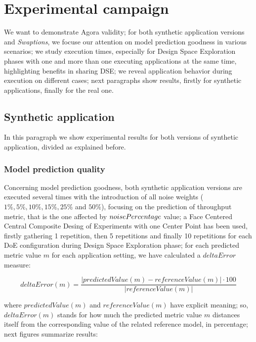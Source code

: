 \section{Experimental campaign}\label{campaign}

We want to demonstrate Agora validity; for both synthetic application versions and \textit{Swaptions}, we focuse our attention on model prediction goodness in various scenarios; we study execution times, especially for Design Space Exploration phases with one and more than one executing applications at the same time, highlighting benefits in sharing DSE; we reveal application behavior during execution on different cases; next paragraphs show results, firstly for synthetic applications, finally for the real one.


\subsection{Synthetic application}

In this paragraph we show experimental results for both versions of synthetic application, divided as explained before.


\subsubsection{Model prediction quality}\label{deltaErrorExplanation}

Concerning model prediction goodness, both synthetic application versions are executed several times with the introduction of all noise weights ($1\%, 5\%, 10\%, 15\%, 25\%$ and $50\%$), focusing on the prediction of throughput metric, that is the one affected by $noise\-Percentage$ value; a Face Centered Central Composite Desing of Experiments with one Center Point has been used, firstly gathering 1 repetition, then 5 repetitions and finally 10 repetitions for each DoE configuration during Design Space Exploration phase; for each predicted metric value $m$ for each application setting, we have calculated a $deltaError$ measure:

\[
deltaError(m) = \dfrac{\left\vert predictedValue(m) - referenceValue(m) \right\vert \cdot 100}{\left\vert referenceValue(m) \right\vert}
\]

where $predictedValue(m)$ and $referenceValue(m)$ have explicit meaning; so, $deltaError(m)$ stands for how much the predicted metric value $m$ distances itself from the corresponding value of the related reference model, in percentage; next figures summarize results:





